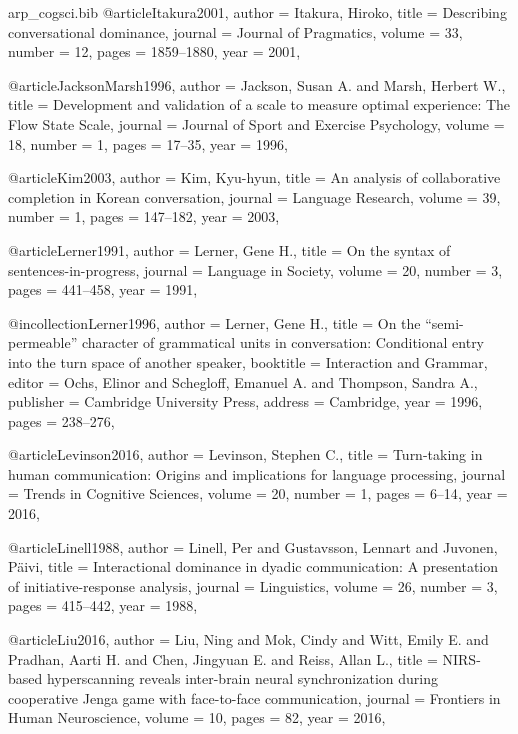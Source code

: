 \begin{filecontents*}[overwrite]{arp_cogsci.bib}
@article{Itakura2001,
  author  = {Itakura, Hiroko},
  title   = {Describing conversational dominance},
  journal = {Journal of Pragmatics},
  volume  = {33},
  number  = {12},
  pages   = {1859--1880},
  year    = {2001},
}

@article{JacksonMarsh1996,
  author  = {Jackson, Susan A. and Marsh, Herbert W.},
  title   = {Development and validation of a scale to measure optimal experience: The {Flow State Scale}},
  journal = {Journal of Sport and Exercise Psychology},
  volume  = {18},
  number  = {1},
  pages   = {17--35},
  year    = {1996},
}

@article{Kim2003,
  author  = {Kim, Kyu-hyun},
  title   = {An analysis of collaborative completion in {Korean} conversation},
  journal = {Language Research},
  volume  = {39},
  number  = {1},
  pages   = {147--182},
  year    = {2003},
}

@article{Lerner1991,
  author  = {Lerner, Gene H.},
  title   = {On the syntax of sentences-in-progress},
  journal = {Language in Society},
  volume  = {20},
  number  = {3},
  pages   = {441--458},
  year    = {1991},
}

@incollection{Lerner1996,
  author    = {Lerner, Gene H.},
  title     = {On the ``semi-permeable'' character of grammatical units in conversation: Conditional entry into the turn space of another speaker},
  booktitle = {Interaction and Grammar},
  editor    = {Ochs, Elinor and Schegloff, Emanuel A. and Thompson, Sandra A.},
  publisher = {Cambridge University Press},
  address   = {Cambridge},
  year      = {1996},
  pages     = {238--276},
}

@article{Levinson2016,
  author  = {Levinson, Stephen C.},
  title   = {Turn-taking in human communication: Origins and implications for language processing},
  journal = {Trends in Cognitive Sciences},
  volume  = {20},
  number  = {1},
  pages   = {6--14},
  year    = {2016},
}

@article{Linell1988,
  author  = {Linell, Per and Gustavsson, Lennart and Juvonen, P{\"a}ivi},
  title   = {Interactional dominance in dyadic communication: A presentation of initiative-response analysis},
  journal = {Linguistics},
  volume  = {26},
  number  = {3},
  pages   = {415--442},
  year    = {1988},
}

@article{Liu2016,
  author  = {Liu, Ning and Mok, Cindy and Witt, Emily E. and Pradhan, Aarti H. and Chen, Jingyuan E. and Reiss, Allan L.},
  title   = {{NIRS}-based hyperscanning reveals inter-brain neural synchronization during cooperative {Jenga} game with face-to-face communication},
  journal = {Frontiers in Human Neuroscience},
  volume  = {10},
  pages   = {82},
  year    = {2016},
}


\end{filecontents*}

